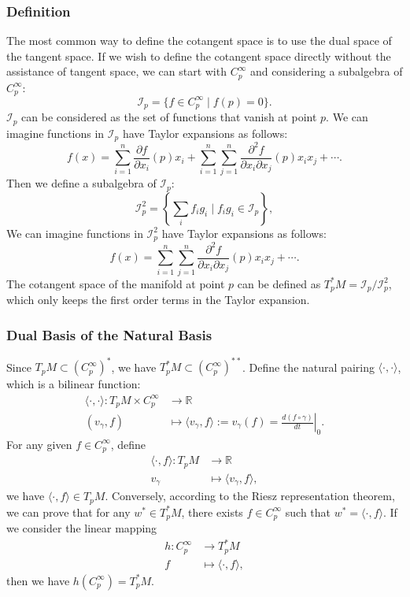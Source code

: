 \documentclass{report}
\begin{document}
\subsubsection{Definition}
The most common way to define the cotangent space is to use the dual space of the tangent space.
If we wish to define the cotangent space directly without the assistance of tangent space, we can start with $C^\infty_p$ and considering a subalgebra of $C^\infty_p$:
\[
    \mathcal{I}_p=\{f\in C^\infty_p\mid f(p)=0\}.
\]
$\mathcal{I}_p$ can be considered as the set of functions that vanish at point $p$. We can imagine functions in $\mathcal{I}_p$ have Taylor expansions as follows:
\[
    f(x)=\sum_{i=1}^n\frac{\partial f}{\partial x_i}(p)x_i+\sum_{i=1}^n\sum_{j=1}^n\frac{\partial^2 f}{\partial x_i\partial x_j}(p)x_ix_j+\cdots.
\] 
Then we define a subalgebra of $\mathcal{I}_p$:
\[
    \mathcal{I}^2_p=\left\{\sum_if_ig_i\mid f_ig_i\in \mathcal{I}_p\right\},
\]
We can imagine functions in $\mathcal{I}_p^2$ have Taylor expansions as follows:
\[
    f(x)=\sum_{i=1}^n\sum_{j=1}^n\frac{\partial^2 f}{\partial x_i\partial x_j}(p)x_ix_j+\cdots.
\] 
The cotangent space of the manifold at point $p$ can be defined as $T_p^*M=\mathcal{I}_p/\mathcal{I}^2_p$, which only keeps the first order terms in the Taylor expansion.

\subsubsection{Dual Basis of the Natural Basis}
Since $T_pM\subset \left(C^\infty_p\right)^*$, we have $T_p^*M\subset \left(C^\infty_p\right)^{**}$. Define the natural pairing $\langle\cdot,\cdot\rangle$, which is a bilinear function:
\[
    \begin{aligned}
    \langle\cdot,\cdot\rangle:T_pM\times C^\infty_p&\longrightarrow\mathbb{R}\\
    (v_\gamma,f)&\longmapsto\langle v_\gamma,f\rangle:=v_\gamma(f)=\left.\frac{d(f\circ \gamma)}{dt}\right|_{0}.
    \end{aligned}
\]
For any given $f\in C^\infty_p$, define
\[
    \begin{aligned}
        \langle\cdot,f\rangle:T_pM&\longrightarrow\mathbb{R}\\
        v_\gamma&\longmapsto\langle v_\gamma,f\rangle,
    \end{aligned}
\]
we have $\langle\cdot,f\rangle\in T_pM$. Conversely, according to the Riesz representation theorem, we can prove that for any $w^*\in T_p^*M$, there exists $f\in C^\infty_p$ such that $w^*=\langle\cdot,f\rangle$. If we consider the linear mapping
\[
    \begin{aligned}
        h:C^\infty_p&\longrightarrow T_p^*M\\
        f&\longmapsto\langle\cdot,f\rangle,
    \end{aligned}
\]
then we have $h(C^\infty_p)=T_p^*M$.
\end{document}

